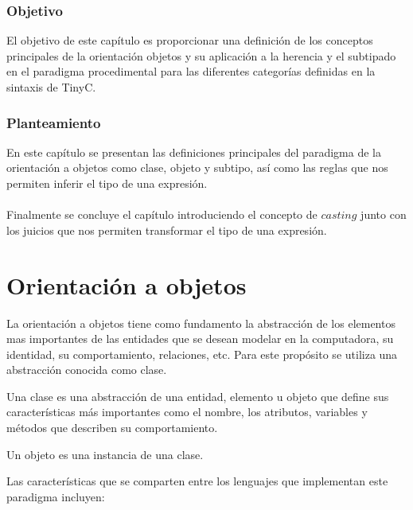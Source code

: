 \subsubsection{Objetivo}
El objetivo de este capítulo es proporcionar una definición de los conceptos principales de la orientación objetos y su aplicación a la herencia y el subtipado en el paradigma procedimental para las diferentes categorías definidas en la sintaxis de \textsf{TinyC}.

\subsubsection{Planteamiento}
En este capítulo se presentan las definiciones principales del paradigma de la orientación a objetos como clase, objeto y subtipo, así como las reglas que nos permiten inferir el tipo de una expresión.\\\\
Finalmente se concluye el capítulo introduciendo el concepto de $casting$ junto con los juicios que nos permiten transformar el tipo de una expresión. 

\section{Orientación a objetos}
La orientación a objetos tiene como fundamento la abstracción de los elementos mas importantes de las entidades que se desean modelar en la computadora, su identidad, su comportamiento, relaciones, etc. Para este propósito se utiliza una abstracción conocida como clase. 

\begin{definition}
    Una clase es una abstracción de una entidad, elemento u objeto que define sus características más importantes como el nombre, los atributos, variables y métodos que describen su comportamiento.
\end{definition}
\bigskip
\begin{definition}
    Un objeto es una instancia de una clase.
\end{definition}

Las características que se comparten entre los lenguajes que implementan este paradigma incluyen:

